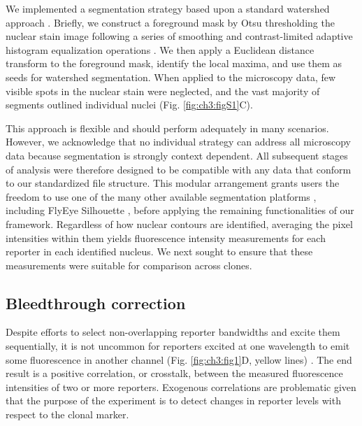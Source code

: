 We implemented a segmentation strategy based upon a standard watershed approach \cite{vanderWalt2014}. Briefly, we construct a foreground mask by Otsu thresholding the nuclear stain image following a series of smoothing and contrast-limited adaptive histogram equalization operations \cite{Otsu1979,vanderWalt2014}. We then apply a Euclidean distance transform to the foreground mask, identify the local maxima, and use them as seeds for watershed segmentation. When applied to the microscopy data, few visible spots in the nuclear stain were neglected, and the vast majority of segments outlined individual nuclei (Fig. \ref{fig:ch3:figS1}C).

This approach is flexible and should perform adequately in many scenarios. However, we acknowledge that no individual strategy can address all microscopy data because segmentation is strongly context dependent. All subsequent stages of analysis were therefore designed to be compatible with any data that conform to our standardized file structure. This modular arrangement grants users the freedom to use one of the many other available segmentation platforms \cite{Bugarski2014}, including FlyEye Silhouette \cite{Pelaez2015}, before applying the remaining functionalities of our framework. Regardless of how nuclear contours are identified, averaging the pixel intensities within them yields fluorescence intensity measurements for each reporter in each identified nucleus. We next sought to ensure that these measurements were suitable for comparison across clones.

\subsection{Bleedthrough correction}







Despite efforts to select non-overlapping reporter bandwidths and excite them sequentially, it is not uncommon for reporters excited at one wavelength to emit some fluorescence in another channel (Fig. \ref{fig:ch3:fig1}D, yellow lines) \cite{Bacia2012,Zinchuk2007}. The end result is a positive correlation, or crosstalk, between the measured fluorescence intensities of two or more reporters. Exogenous correlations are problematic given that the purpose of the experiment is to detect changes in reporter levels with respect to the clonal marker.

